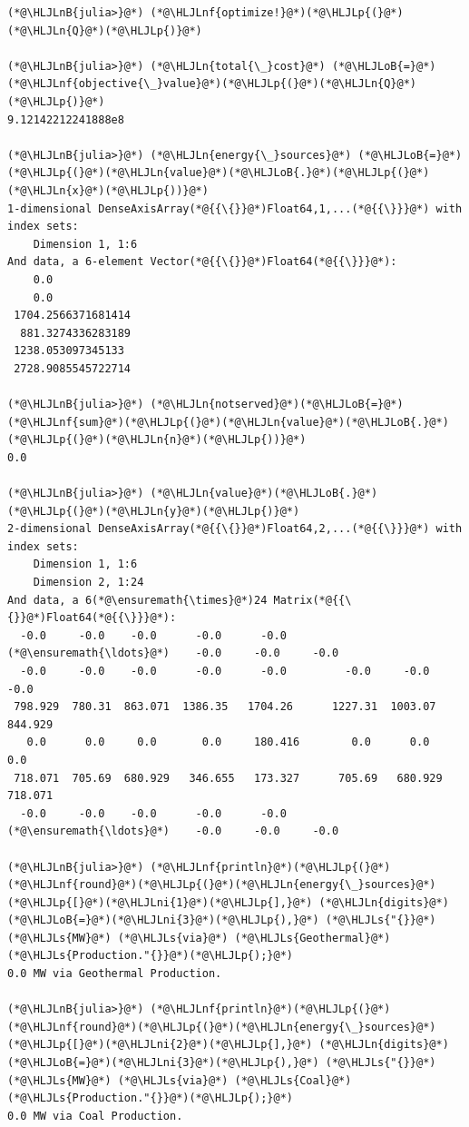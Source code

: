 \documentclass[12pt,a4paper]{article}
\newcommand{\HLJLn}[1]{#1}
\newcommand{\HLJLnf}[1]{\textcolor[RGB]{66,102,213}{#1}}
\newcommand{\HLJLs}[1]{\textcolor[RGB]{201,61,57}{#1}}
\newcommand{\HLJLnB}[1]{\textcolor[RGB]{59,151,46}{#1}}
\newcommand{\HLJLni}[1]{\textcolor[RGB]{59,151,46}{#1}}
\newcommand{\HLJLoB}[1]{\textcolor[RGB]{102,102,102}{\textbf{#1}}}
\newcommand{\HLJLp}[1]{#1}
\begin{document}
\begin{lstlisting}
(*@\HLJLnB{julia>}@*) (*@\HLJLnf{optimize!}@*)(*@\HLJLp{(}@*)(*@\HLJLn{Q}@*)(*@\HLJLp{)}@*)

(*@\HLJLnB{julia>}@*) (*@\HLJLn{total{\_}cost}@*) (*@\HLJLoB{=}@*) (*@\HLJLnf{objective{\_}value}@*)(*@\HLJLp{(}@*)(*@\HLJLn{Q}@*)(*@\HLJLp{)}@*)
9.12142212241888e8

(*@\HLJLnB{julia>}@*) (*@\HLJLn{energy{\_}sources}@*) (*@\HLJLoB{=}@*) (*@\HLJLp{(}@*)(*@\HLJLn{value}@*)(*@\HLJLoB{.}@*)(*@\HLJLp{(}@*)(*@\HLJLn{x}@*)(*@\HLJLp{))}@*)
1-dimensional DenseAxisArray(*@{{\{}}@*)Float64,1,...(*@{{\}}}@*) with index sets:
    Dimension 1, 1:6
And data, a 6-element Vector(*@{{\{}}@*)Float64(*@{{\}}}@*):
    0.0
    0.0
 1704.2566371681414
  881.3274336283189
 1238.053097345133
 2728.9085545722714

(*@\HLJLnB{julia>}@*) (*@\HLJLn{notserved}@*)(*@\HLJLoB{=}@*) (*@\HLJLnf{sum}@*)(*@\HLJLp{(}@*)(*@\HLJLn{value}@*)(*@\HLJLoB{.}@*)(*@\HLJLp{(}@*)(*@\HLJLn{n}@*)(*@\HLJLp{))}@*)
0.0

(*@\HLJLnB{julia>}@*) (*@\HLJLn{value}@*)(*@\HLJLoB{.}@*)(*@\HLJLp{(}@*)(*@\HLJLn{y}@*)(*@\HLJLp{)}@*)
2-dimensional DenseAxisArray(*@{{\{}}@*)Float64,2,...(*@{{\}}}@*) with index sets:
    Dimension 1, 1:6
    Dimension 2, 1:24
And data, a 6(*@\ensuremath{\times}@*)24 Matrix(*@{{\{}}@*)Float64(*@{{\}}}@*):
  -0.0     -0.0    -0.0      -0.0      -0.0    (*@\ensuremath{\ldots}@*)    -0.0     -0.0     -0.0
  -0.0     -0.0    -0.0      -0.0      -0.0         -0.0     -0.0     -0.0
 798.929  780.31  863.071  1386.35   1704.26      1227.31  1003.07   844.929
   0.0      0.0     0.0       0.0     180.416        0.0      0.0      0.0
 718.071  705.69  680.929   346.655   173.327      705.69   680.929  718.071
  -0.0     -0.0    -0.0      -0.0      -0.0    (*@\ensuremath{\ldots}@*)    -0.0     -0.0     -0.0

(*@\HLJLnB{julia>}@*) (*@\HLJLnf{println}@*)(*@\HLJLp{(}@*)(*@\HLJLnf{round}@*)(*@\HLJLp{(}@*)(*@\HLJLn{energy{\_}sources}@*)(*@\HLJLp{[}@*)(*@\HLJLni{1}@*)(*@\HLJLp{],}@*) (*@\HLJLn{digits}@*) (*@\HLJLoB{=}@*)(*@\HLJLni{3}@*)(*@\HLJLp{),}@*) (*@\HLJLs{"{}}@*) (*@\HLJLs{MW}@*) (*@\HLJLs{via}@*) (*@\HLJLs{Geothermal}@*) (*@\HLJLs{Production."{}}@*)(*@\HLJLp{);}@*)
0.0 MW via Geothermal Production.

(*@\HLJLnB{julia>}@*) (*@\HLJLnf{println}@*)(*@\HLJLp{(}@*)(*@\HLJLnf{round}@*)(*@\HLJLp{(}@*)(*@\HLJLn{energy{\_}sources}@*)(*@\HLJLp{[}@*)(*@\HLJLni{2}@*)(*@\HLJLp{],}@*) (*@\HLJLn{digits}@*) (*@\HLJLoB{=}@*)(*@\HLJLni{3}@*)(*@\HLJLp{),}@*) (*@\HLJLs{"{}}@*) (*@\HLJLs{MW}@*) (*@\HLJLs{via}@*) (*@\HLJLs{Coal}@*) (*@\HLJLs{Production."{}}@*)(*@\HLJLp{);}@*)
0.0 MW via Coal Production.


\end{lstlisting}
\end{document}

